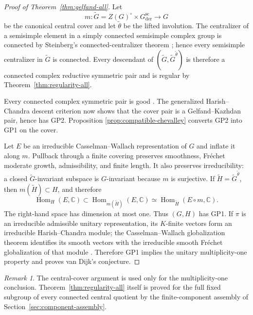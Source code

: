 \documentclass[11pt,reqno]{amsart}
\numberwithin{equation}{section}
\theoremstyle{definition}
\theoremstyle{remark}
\newtheorem{remark}[theorem]{Remark}
\newcommand{\C}{\mathbb C}
\newcommand{\Hom}{\operatorname{Hom}}
\begin{document}
\begin{proof}[Proof of Theorem~\ref{thm:gelfand-all}]
Let
\[
 m:\widetilde G=Z(G)^\circ\times G_{\mathrm{der}}^{\mathrm{sc}}\longrightarrow G
\]
be the canonical central cover and let $\widetilde\theta$ be the lifted
involution.  The centralizer of a semisimple element in a simply connected
semisimple complex group is connected by Steinberg's connected-centralizer
theorem \cite{Steinberg}; hence every
semisimple centralizer in $\widetilde G$ is connected.  Every descendant of
$(\widetilde G,\widetilde G^{\widetilde\theta})$ is therefore a connected
complex reductive symmetric pair and is regular by
Theorem~\ref{thm:regularity-all}.

Every connected complex symmetric pair is good
\cite[Corollary~7.1.7]{AG09}.  The generalized Harish--Chandra descent
criterion \cite[Theorem~7.4.5]{AG09} now shows that the cover pair is a
Gelfand--Kazhdan pair, hence has GP2.  Proposition
\ref{prop:compatible-chevalley} converts GP2 into GP1 on the cover.

Let $E$ be an irreducible Casselman--Wallach representation of $G$ and inflate
it along $m$.  Pullback through a finite covering preserves smoothness,
Fr\'echet moderate growth, admissibility, and finite length.  It also preserves
irreducibility: a closed $\widetilde G$-invariant subspace is $G$-invariant
because $m$ is surjective.  If
$\widetilde H=\widetilde G^{\widetilde\theta}$, then
$m(\widetilde H)\subset H$, and therefore
\[
 \Hom_H(E,\C)\subset
 \Hom_{m(\widetilde H)}(E,\C)
 \simeq\Hom_{\widetilde H}(E\circ m,\C).
\]
The right-hand space has dimension at most one.  Thus $(G,H)$ has GP1.  If
$\pi$ is an irreducible admissible unitary representation, its $K$-finite
vectors form an irreducible Harish--Chandra module; the Casselman--Wallach
globalization theorem identifies its smooth vectors with the irreducible
smooth Fr\'echet globalization of that module
\cite[Theorem~10.6]{BernsteinKrotz}.  Therefore GP1 implies the unitary
multiplicity-one property and proves van Dijk's conjecture.
\end{proof}

\begin{remark}
The central-cover argument is used only for the multiplicity-one conclusion.
Theorem~\ref{thm:regularity-all} itself is proved for the full fixed subgroup of
every connected central quotient by the finite-component assembly of
Section~\ref{sec:component-assembly}.
\end{remark}
\end{document}
